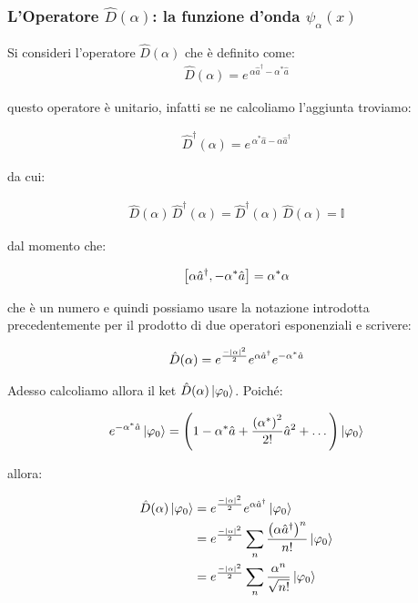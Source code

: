 \subsubsection{L'Operatore $\hat{D}(\alpha)$: la funzione d'onda $\psi_{\alpha}(x)$ }

\begin{mydef}
	Si consideri l'operatore $\hat{D}(\alpha)$ che è definito come:
\begin{align*}
	\hat{D}(\alpha) = e^{\, \alpha \hat{a}^{\dagger} - \alpha^* \hat{a}}
\end{align*}
\end{mydef}

	questo operatore è unitario, infatti se ne calcoliamo l'aggiunta troviamo:

\begin{align*}
	\hat{D}^{\dagger}(\alpha) = e^{\, \alpha^* \hat{a} - \alpha \hat{a}^{\dagger}} 
\end{align*}	

	da cui:
	
\begin{align*}
	\hat{D}(\alpha) \, \hat{D}^{\dagger}(\alpha) = \hat{D}^{\dagger}(\alpha) \, \hat{D}(\alpha) = \mathbb{I}
\end{align*}

	dal momento che:
	
\begin{align*}
	\qty[\alpha \hat{a}^{\dagger}, - \alpha^* \hat{a}]  = \alpha^* \alpha
\end{align*}

	che è un numero e quindi possiamo usare la notazione introdotta precedentemente per il prodotto di due operatori esponenziali e scrivere:
	
\begin{align*}
	\hat{D}\qty(\alpha) = e^{\frac{- |\alpha|^2}{2}} e^{\alpha \hat{a}^{\dagger}} e ^{-\alpha^* \hat{a}}
\end{align*}

	Adesso calcoliamo allora il ket $\hat{D}\qty(\alpha) \ket{\varphi_0}$. Poiché:
	
\begin{align*}
	e^{- \alpha^* \hat{a}} \ket{\varphi_0} = \qty(1 - \alpha^* \hat{a} +\frac{\qty(\alpha^*)^2}{2!} \hat{a}^2 + \dots) \ket{\varphi_0} 
\end{align*}
	
	allora:
	
\begin{align*}
	\hat{D}\qty(\alpha) \ket{\varphi_0} &= e^{\frac{- |\alpha|^2}{2}} e^{\alpha \hat{a}^{\dagger}} \ket{\varphi_0} \\
	& =  e^{\frac{- |\alpha|^2}{2}} \sum_n \frac{\qty(\alpha \hat{a}^{\dagger})^n}{n!} \ket{\varphi_0} \\
	& = e^{\frac{- |\alpha|^2}{2}}\sum_n \frac{\alpha^n}{\sqrt{n!}} \ket{\varphi_0}
\end{align*}

